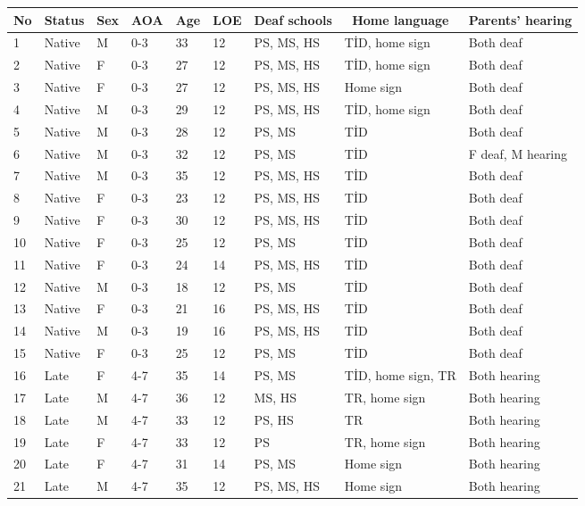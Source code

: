 \begin{appendix}
\begin{table}[h]
\begin{center}
\begin{threeparttable}
{\begin{tabular}{lllllllll}
\toprule
No & \multicolumn{1}{c}{Status} & \multicolumn{1}{c}{Sex} & \multicolumn{1}{c}{AOA} & \multicolumn{1}{c}{Age} & \multicolumn{1}{c}{LOE} & \multicolumn{1}{c}{Deaf schools} & \multicolumn{1}{c}{Home language} & \multicolumn{1}{c}{Parents' hearing}\\
\midrule
1 & Native & M & 0-3 & 33 & 12 & PS, MS, HS & TİD, home sign & Both deaf\\
2 & Native & F & 0-3 & 27 & 12 & PS, MS, HS & TİD, home sign & Both deaf\\
3 & Native & F & 0-3 & 27 & 12 & PS, MS, HS & Home sign & Both deaf\\
4 & Native & M & 0-3 & 29 & 12 & PS, MS, HS & TİD, home sign & Both deaf\\
5 & Native & M & 0-3 & 28 & 12 & PS, MS & TİD & Both deaf\\
6 & Native & M & 0-3 & 32 & 12 & PS, MS & TİD & F deaf, M hearing\\
7 & Native & M & 0-3 & 35 & 12 & PS, MS, HS & TİD & Both deaf\\
8 & Native & F & 0-3 & 23 & 12 & PS, MS, HS & TİD & Both deaf\\
9 & Native & F & 0-3 & 30 & 12 & PS, MS, HS & TİD & Both deaf\\
10 & Native & F & 0-3 & 25 & 12 & PS, MS & TİD & Both deaf\\
11 & Native & F & 0-3 & 24 & 14 & PS, MS, HS & TİD & Both deaf\\
12 & Native & M & 0-3 & 18 & 12 & PS, MS & TİD & Both deaf\\
13 & Native & F & 0-3 & 21 & 16 & PS, MS, HS & TİD & Both deaf\\
14 & Native & M & 0-3 & 19 & 16 & PS, MS, HS & TİD & Both deaf\\
15 & Native & F & 0-3 & 25 & 12 & PS, MS & TİD & Both deaf\\
16 & Late & F & 4-7 & 35 & 14 & PS, MS & TİD, home sign, TR & Both hearing\\
17 & Late & M & 4-7 & 36 & 12 & MS, HS & TR, home sign & Both hearing\\
18 & Late & M & 4-7 & 33 & 12 & PS, HS & TR & Both hearing\\
19 & Late & F & 4-7 & 33 & 12 & PS & TR, home sign & Both hearing\\
20 & Late & F & 4-7 & 31 & 14 & PS, MS & Home sign & Both hearing\\
21 & Late & M & 4-7 & 35 & 12 & PS, MS, HS & Home sign & Both hearing\\

\end{tabular}}
\end{threeparttable}
\end{center}
\end{table}
\end{appendix}
